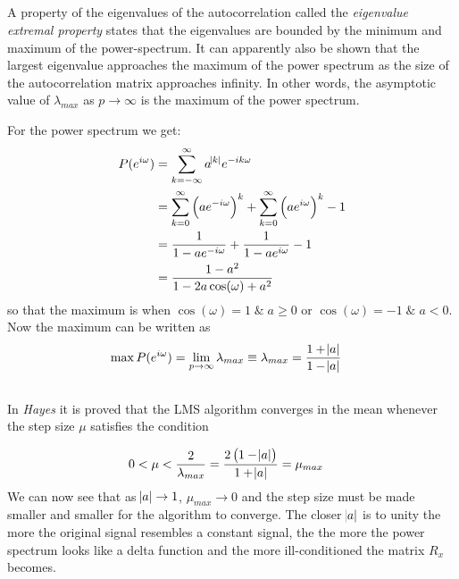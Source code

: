 \subsection{}
A property of the eigenvalues of the autocorrelation called the
\emph{eigenvalue extremal property} states that the eigenvalues
are bounded by the minimum and maximum of the power-spectrum. It can apparently
also be shown that the largest eigenvalue approaches the maximum
of the power spectrum as the size of the autocorrelation matrix approaches infinity.
In other words, the asymptotic value of $\lambda_{max}$ as $p\to\infty$ is
the maximum of the power spectrum.

For the power spectrum we get:
\begin{align}
	P(e^{i\omega})&=\sum_{k=-\infty}^{\infty}a^{\abs{k}}e^{-ik\omega}\\
	&=\sum_{k=0}^{\infty}\left(ae^{-i\omega}\right)^k+\sum_{k=0}^{\infty}\left(ae^{i\omega}\right)^k-1\\
	&=\frac{1}{1-ae^{-i\omega}}+\frac{1}{1-ae^{i\omega}}-1\\
	&=\frac{1-a^2}{1-2a\cos(\omega)+a^2}
\end{align}
so that the maximum is when $\cos(\omega)=1 \; \& \; a \ge 0 $ or $\cos(\omega)=-1 \; \& \; a < 0$.
Now the maximum can be written as
\begin{align}
	\max P(e^{i\omega})&=\lim_{p\to\infty}\lambda_{max}\equiv \lambda_{max}=\frac{1+\abs{a}}{1-\abs{a}}
	\label{'}
\end{align}

\subsection{}

In \emph{Hayes} it is proved that the LMS algorithm converges in the mean
whenever the step size $\mu$ satisfies the condition

\begin{align}
		0 < \mu < \frac{2}{\lambda_{max}} &= \frac{2\left(1-\abs{a}\right)}{1+\abs{a}}=\mu_{max}
\end{align}
We can now see that as $\abs{a}\to 1$, $\mu_{max}\to 0$ and the step size
must be made smaller and smaller for the algorithm to converge. The closer
$\abs{a}$ is to unity the more the original signal resembles a constant signal, the
the more the power spectrum looks like a delta function and the more ill-conditioned the matrix $R_x$ becomes.




